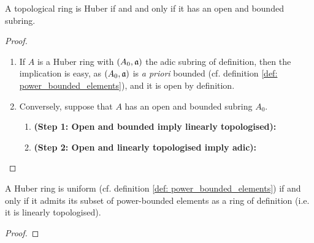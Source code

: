            \begin{proposition} \label{prop: huber_criteria}
                A topological ring is Huber if and and only if it has an open and bounded subring. 
            \end{proposition}
                \begin{proof}
                    \noindent
                    \begin{enumerate}
                        \item If $A$ is a Huber ring with $(A_0, \mathfrak{a})$ the adic subring of definition, then the implication is easy, as $(A_0, \mathfrak{a})$ is \textit{a priori} bounded (cf. definition \ref{def: power_bounded_elements}), and it is open by definition. 
                        \item Conversely, suppose that $A$ has an open and bounded subring $A_0$. 
                            \begin{enumerate}
                                \item \textbf{(Step 1: Open and bounded imply linearly topologised):}
                                \item \textbf{(Step 2: Open and linearly topologised imply adic):}
                            \end{enumerate}
                    \end{enumerate}
                \end{proof}
            \begin{corollary} \label{coro: uniformity_criterion}
                A Huber ring is uniform (cf. definition \ref{def: power_bounded_elements}) if and only if it admits its subset of power-bounded elements as a ring of definition (i.e. it is linearly topologised). 
            \end{corollary}
                \begin{proof}
                    
                \end{proof}
                
